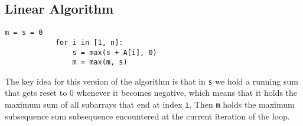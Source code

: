 \documentclass[11pt]{article}
\begin{document}
	\subsection{Linear Algorithm}
		\begin{lstlisting}[autogobble=true]
			m = s = 0
			for i in [1, n]:
				s = max(s + A[i], 0)
				m = max(m, s)
		\end{lstlisting}
		
		The key idea for this version of the algorithm is that in \verb|s| we hold a running sum that gets reset to 0 whenever it becomes negative, which means that it holds the maximum sum of all subarrays that end at index \verb|i|. Then \verb|m| holds the maximum subsequence sum subsequence encountered at the current iteration of the loop.
	

%		
%		


\end{document}
